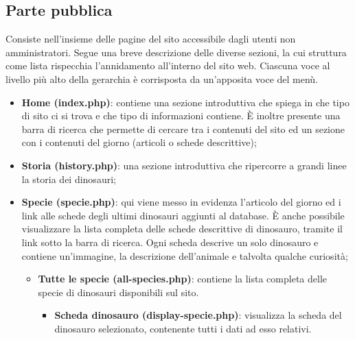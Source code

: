 \documentclass[12pt]{article}
\begin{document}
	\subsection{Parte pubblica}
	
	Consiste nell'insieme delle pagine del sito accessibile dagli utenti non amministratori. Segue una breve descrizione delle diverse sezioni, la cui struttura come lista rispecchia l'annidamento all'interno del sito web. Ciascuna voce al livello più alto della gerarchia è corrisposta da un'apposita voce del menù.
	\begin{itemize}
		\item \textbf{Home (index.php)}: contiene una sezione introduttiva che spiega in che tipo di sito ci si trova e che tipo di informazioni contiene. È inoltre presente una barra di ricerca che permette di cercare tra i contenuti del sito ed un sezione con i contenuti del giorno (articoli o schede descrittive);
		\item \textbf{Storia (history.php)}: una sezione introduttiva che ripercorre a grandi linee la storia dei dinosauri;
		\item \textbf{Specie (specie.php)}: qui viene messo in evidenza l'articolo del giorno ed i link alle schede degli ultimi dinosauri aggiunti al database. È anche possibile visualizzare la lista completa delle schede descrittive di dinosauro, tramite il link sotto la barra di ricerca. Ogni scheda descrive un solo dinosauro e contiene un'immagine, la descrizione dell'animale e talvolta qualche curiosità;
			\begin{itemize}
				\item \textbf{Tutte le specie (all-species.php)}: contiene la lista completa delle specie di dinosauri disponibili sul sito.
				\begin{itemize}
					\item \textbf{Scheda dinosauro (display-specie.php)}: visualizza la scheda del dinosauro selezionato, contenente tutti i dati ad esso relativi.
				\end{itemize}
			\end{itemize}
			

\end{itemize}
\end{document}
